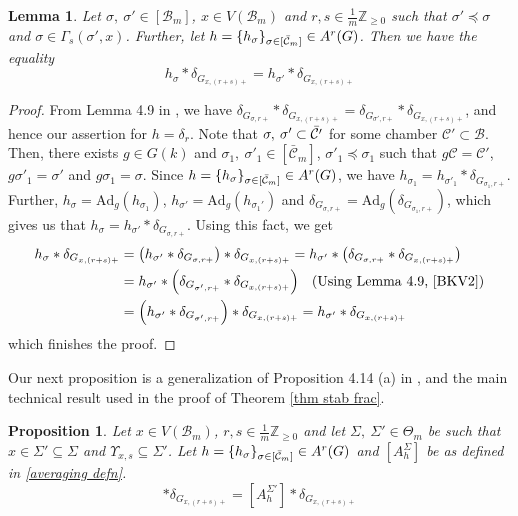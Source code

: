 \documentclass[11 pt]{article}
\numberwithin{equation}{subsection}
\newtheorem{proposition}[theorem]{Proposition}
\newtheorem{lemma}[theorem]{Lemma}
\theoremstyle{definition}
\theoremstyle{remark}
\theoremstyle{conjecture}
\newcommand{\Ad}{\mathrm{Ad}}
\newcommand{\Z}{\mathbb Z}
\newcommand{\B}{\mathcal{B}}
\newcommand{\mcC}{\mathcal C}
\newcommand{\blue}{\textcolor{blue}}
\begin{document}

\begin{lemma}\label{lemma stab frac}
    Let $\sigma,\: \sigma' \in [\B_m]$, $x\in V(\B_m)$ and $r,s \in \frac{1}{m}\Z_{\geq 0} $ such that $\sigma' \preceq \sigma $ and $\sigma \in \Gamma_s(\sigma',x)$. Further, let $h=\{ h_\sigma\}_{\sigma\in [\Bar{\mcC}_m]}\in A^r(G)$.  Then we have the equality 
    \begin{equation}
        h_{\sigma}* \delta_{G_{x,(r+s)+}}=h_{\sigma'}*\delta_{G_{x,(r+s)+}}
    \end{equation}
\end{lemma}
\begin{proof}
    From Lemma 4.9 in \cite{BKV2},  we have $ \delta_{G_{\sigma, r+}} * \delta_{G_{x,(r+s)+}}=\delta_{G_{\sigma', r+}}*\delta_{G_{x,(r+s)+}}$, and hence our assertion for $h=\delta_r$.  Note that $ \sigma,\: \sigma' \subset \Bar{\mcC'}$ for some chamber $\mcC'\subset \B$. Then, there exists $g \in G(k)$ and $\sigma_1,\: {\sigma'}_1 \in [\bar{\mcC}_m]$, ${\sigma'}_1 \preceq \sigma_1$ such that $g\mcC =\mcC'$, $g{\sigma'}_1 =  \sigma' $ and $g \sigma_1= \sigma $. Since $h=\{ h_\sigma\}_{\sigma\in [\Bar{\mcC}_m]}\in A^r(G)$, we have $h_{\sigma_1}= h_{{\sigma'}_1}* \delta_{G_{\sigma_1, r+}}$. Further, $h_\sigma= \Ad_g(h_{\sigma_1})$, $h_{\sigma'}= \Ad_g(h_{\sigma_1'})$ and $\delta_{G_{\sigma, r+}}= \Ad_g(\delta_{G_{\sigma_1, r+}})$, which gives us that $h_{\sigma}= h_{{\sigma'}}* \delta_{G_{\sigma, r+}}$. Using this fact, we get 
    \begin{align*}
         h_{\sigma}* \delta_{G_{x,(r+s)+}}&= \left(h_{\sigma'}* \delta_{G_{\sigma, r+}}\right)* \delta_{G_{x,(r+s)+}} =h_{\sigma'}* \left(\delta_{G_{\sigma, r+}}* \delta_{G_{x,(r+s)+}}\right)\\
         &=h_{\sigma'}* \left(\delta_{G_{\sigma', r+}}* \delta_{G_{x,(r+s)+}}\right) \:\:\text{ (Using Lemma 4.9, \cite{BKV2})}\\
         &=\left(h_{\sigma'}* \delta_{G_{\sigma', r+}}\right)* \delta_{G_{x,(r+s)+}}=h_{\sigma'}*\delta_{G_{x,(r+s)+}}       
    \end{align*}
    which finishes the proof. 
\end{proof}
Our next proposition is a generalization of Proposition 4.14 (a) in \cite{BKV2}, and the main technical result used in the proof of Theorem \ref{thm stab frac}.
\begin{proposition}\label{prop satb frac}
    Let $x\in V(\B_m)$, $r,s \in \frac{1}{m}\Z_{\geq 0}$ and let $\Sigma,\: \Sigma' \in \Theta_m$ be such that $x\in \Sigma' \subseteq \Sigma$ and $\Upsilon_{x,s} \subseteq \Sigma'$. Let $h=\{ h_\sigma\}_{\sigma\in [\Bar{\mcC}_m]}\in A^r(G)$ and $[A^{\Sigma}_h]$ be as defined in \eqref{averaging defn}. 
    \begin{equation}
        [A^{\Sigma}_h]* \delta_{G_{x,(r+s)+}}=[A^{\Sigma'}_h]*\delta_{G_{x,(r+s)+}}
    \end{equation}
\end{proposition}
\end{document}
